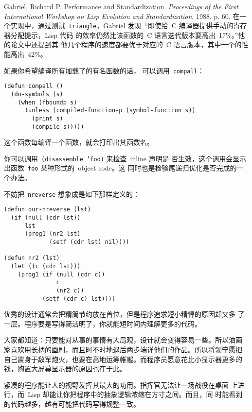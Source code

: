 \begin{notes}
  Gabriel, Richard P. Performance and
  Standardization. \emph{Proceedings of the First International
    Workshop on Lisp Evolution and Standardization}, 1988,
  p. 60. 在一个实现中，通过测试~\texttt{triangle}，Gabriel
  发现~``即使给~C 编译器提供手动的寄存器分配提示，Lisp 代码
  的效率仍然比该函数的~C 语言迭代版本要高出~17\%。''他的论文中还提到其
  他几个程序的速度都要优于对应的~C 语言版本，其中一个的性能高出~42\%。

  如果你希望编译所有加载了的有名函数的话，
  可以调用~\verb|compall|：
\begin{verbatim}
(defun compall ()          
  (do-symbols (s)
    (when (fboundp s)
      (unless (compiled-function-p (symbol-function s))
        (print s)                   
        (compile s)))))        
\end{verbatim}
  这个函数每编译一个函数，就会打印出其函数名。

  你可以调用~\texttt{(disassemble 'foo)} 来检查~inline 声明是
  否生效，这个调用会显示出函数~\texttt{foo} 某种形式的~object code。这
  同时也是检验尾递归优化是否完成的一个办法。

  不妨把~\texttt{nreverse} 想象成是如下那样定义的：
\begin{verbatim}
(defun our-nreverse (lst)          
  (if (null (cdr lst))
      lst
      (prog1 (nr2 lst)                            
             (setf (cdr lst) nil))))

(defun nr2 (lst)
  (let ((c (cdr lst)))          
    (prog1 (if (null (cdr c))                             
               c
               (nr2 c))
           (setf (cdr c) lst)))) 
\end{verbatim}

优秀的设计通常会把精简节约放在首位，但是程序追求短小精悍的原因却又多
了一层。程序要是写得简洁明了，你就能短时间内理解更多的代码。

大家都知道：只要能对从事的事情有大局观，设计就会变得容易一些。所以油画
家喜欢用长柄的画刷，而且时不时地退后两步端详他们的作品。所以将领宁愿把
自己置身于敌军炮火，也要在高地运筹帷幄。而程序员愿意花比小显示器更多的
钱，购置大屏幕显示器的原因也在于此。

紧凑的程序能让人的视野发挥其最大的功用。指挥官无法让一场战役在桌面
上进行，而~Lisp 却能让你把程序中的抽象逻辑浓缩在方寸之间。而且，同
时能看到的代码越多，越有可能把代码写得规整一致。


\end{notes}
